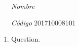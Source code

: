 \documentclass[fleqn]{article}
\begin{document}
\vspace{0.3cm}
\begin{itemize}[leftmargin=6.25cm, labelsep=0.5cm]

  \item[\textit{Nombre}] \scalebox{1.2}{Juan Sebastián Cárdenas
    Rodríguez} %
  \item[\textit{Código}] 201710008101 %

\end{itemize}
\vspace{0.3cm}

\begin{enumerate}
  \item Question.
\end{enumerate}
\end{document}

